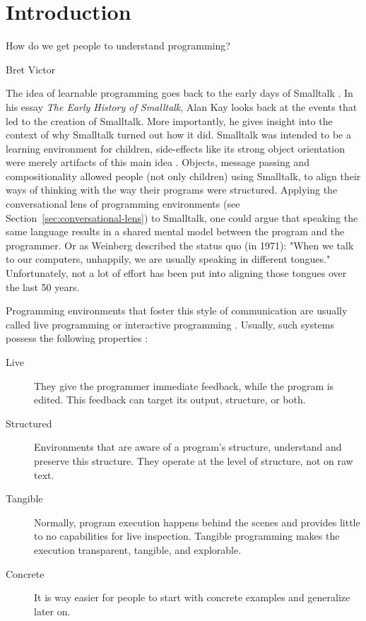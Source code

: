 \chapter{Introduction}
\epigraph{How do we get people to understand programming?}{Bret Victor}

The idea of learnable programming \cite{victor_learnable_2012} goes back to the early days of Smalltalk \cite{kay_early_1993}.
In his essay \emph{The Early History of Smalltalk}, Alan Kay looks back at the events that led to the creation of Smalltalk.
More importantly, he gives insight into the context of why Smalltalk turned out how it did.
Smalltalk was intended to be a learning environment for children, side-effects like its strong object orientation were merely artifacts of this main idea \cite{kay_early_1993}.
Objects, message passing and compositionality allowed people (not only children) using Smalltalk, to align their ways of thinking with the way their programs were structured.
Applying the conversational lens of programming environments (see Section~\ref{sec:conversational-lens}) to Smalltalk, one could argue that speaking the same language results in a shared mental model between the program and the programmer.
Or as Weinberg \cite{weinberg_psychology_1971} described the status quo (in 1971): "When we talk to our computers, unhappily, we are usually speaking in different tongues."
Unfortunately, not a lot of effort has been put into aligning those tongues over the last 50 years.

Programming environments that foster this style of communication are usually called live programming\cite{aguiar_live_2019, church_liveness_2010} or interactive programming \cite{czaplicki_interactive_2013, mccabe_towards_2023}.
Usually, such systems possess the following properties \cite{burg_1st_2013}:
\begin{description}
    \item[Live] They give the programmer immediate feedback, while the program is edited. This feedback can target its output, structure, or both.
    \item[Structured] Environments that are aware of a program's structure, understand and preserve this structure. They operate at the level of structure, not on raw text.
    \item[Tangible] Normally, program execution happens behind the scenes and provides little to no capabilities for live inspection. Tangible programming makes the execution transparent, tangible, and explorable.
    \item[Concrete] It is way easier for people to start with concrete examples and generalize later on.
\end{description}

